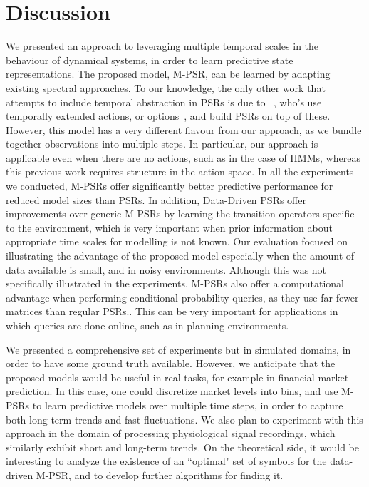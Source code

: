 \section{Discussion}

We presented an approach to leveraging multiple temporal scales in the behaviour of dynamical systems, in order to learn predictive state representations.  The proposed model, M-PSR, can be learned by adapting existing spectral approaches.  To our knowledge, the only other work that attempts to include temporal abstraction in PSRs is due to ~\cite{wolfesingh}, who's use temporally extended actions, or options~\cite{sutton99}, and build PSRs on top of these.  However, this model has a very different flavour from our approach, as we bundle together observations into multiple steps.  In particular, our approach is applicable even when there are no actions, such as in the case of HMMs, whereas this previous work requires structure in the action space.
In all the experiments we conducted, M-PSRs offer significantly better predictive performance for reduced model sizes than PSRs. In addition, Data-Driven PSRs offer improvements over generic M-PSRs by learning the transition operators specific to the environment, which is very important when prior information about appropriate time scales for modelling is not known.  Our evaluation focused on illustrating the advantage of the proposed model especially when the amount of data available is small, and in noisy environments.
 Although this was not specifically illustrated in the experiments. M-PSRs also offer a computational advantage when performing conditional probability queries, as they use far fewer matrices than regular PSRs.. This can be very important for applications in which queries are done online, such as in planning environments. 
 
 We presented a comprehensive set of experiments but in simulated domains, in order to have some ground truth available.  However, we anticipate that the proposed models would be useful in real tasks, for example in financial market prediction.  In this case, one could discretize market levels into bins, and use M-PSRs to learn predictive models over multiple time steps, in order to capture both long-term trends and fast fluctuations.  We also plan to experiment with this approach in the domain of processing physiological signal recordings, which similarly exhibit short and long-term trends.  On the theoretical side, it would be interesting to analyze the existence of an ``optimal" set of symbols for the data-driven M-PSR, and to develop further algorithms for finding it.

